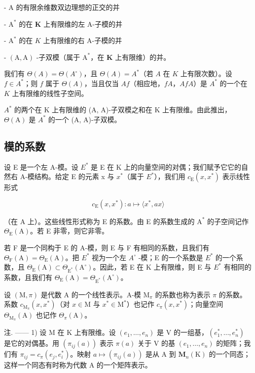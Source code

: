 - \(\mathrm{A}\) 的有限余维数双边理想的正交的并

- \(\mathrm{A}^*\) 的在 \(\mathbf{K}\) 上有限维的左 A-子模的并

- \(\mathrm{A}^*\) 的在 \(K\) 上有限维的右 A-子模的并

- \((\mathrm{A},\mathrm{A})\) -子双模（属于 \(\mathrm{A}^*\)，在 \(\mathbf{K}\) 上有限维）的并。

我们有 \(\Theta(A) = \Theta(A^{\circ})\)，且 \(\Theta(A) = A^{*}\)（若 \(A\) 在 \(K\) 上有限次数）。设 \(f \in A^{*}\)；则 \(f\) 属于 \(\Theta(A)\)，当且仅当 \(Af\)（相应地，\(fA\)，\(AfA\)）是 \(A^{*}\) 的一个在 \(K\) 上有限维的线性子空间。

\(A^{*}\) 的两个在 K 上有限维的 (A, A)-子双模之和在 K 上有限维。由此推出，\(\Theta(\mathrm{A})\) 是 \(A^{*}\) 的一个 (A, A)-子双模。

\subsection{模的系数}

设 E 是一个左 A-模。设 \(E^{*}\) 是 E 在 K 上的向量空间的对偶；我们赋予它它的自然右 A-模结构。给定 E 的元素 x 与 \(x^{*}\)（属于 \(E^{*}\)），我们用 \(c_{\mathrm{E}}(x, x^{*})\) 表示线性形式

\[
c _ {\mathrm{E}} (x, x ^ {*}): a \mapsto \langle x ^ {*}, a x \rangle\tag{5}
\]

（在 A 上）。这些线性形式称为 E 的系数。由 E 的系数生成的 \(\mathrm{A}^*\) 的子空间记作 \(\Theta_{\mathrm{E}}(\mathrm{A})\)。若 E 非零，则它非零。

若 F 是一个同构于 E 的 A-模，则 E 与 F 有相同的系数，且我们有 \(\Theta_{\mathrm{F}}(\mathrm{A}) = \Theta_{\mathrm{E}}(\mathrm{A})\)。把 \(E^{*}\) 视为一个左 \(A^{\circ}\) -模；E 的一个系数是 \(E^{*}\) 的一个系数，且 \(\Theta_{\mathrm{E}}(\mathrm{A}) \subset \Theta_{\mathrm{E}^{*}}(\mathrm{A}^{\circ})\)。因此，若 E 在 K 上有限维，则 E 与 \(E^{*}\) 有相同的系数，且我们有 \(\Theta_{\mathrm{E}}(\mathrm{A}) = \Theta_{\mathrm{E}^{*}}(\mathrm{A}^{\circ})\)。

设 \((\mathrm{M},\pi)\) 是代数 A 的一个线性表示。A-模 \(\mathrm{M}_{\pi}\) 的系数也称为表示 \(\pi\) 的系数。系数 \(c_{\mathrm{M}_{\pi}}(x,x^{*})\)（对 \(x\in \mathrm{M}\) 与 \(x^{*}\in \mathrm{M}^{*}\)）也记作 \(c_{\pi}(x,x^{*})\)；向量空间 \(\Theta_{\mathrm{M}_{\pi}}(\mathrm{A})\) 也记作 \(\Theta_{\pi}(\mathrm{A})\)。

注. —— 1) 设 M 在 K 上有限维。设 \((e_1, \ldots, e_n)\) 是 V 的一组基，\((e_1^*, \ldots, e_n^*)\) 是它的对偶基。用 \((\pi_{ij}(a))\) 表示 \(\pi(a)\) 关于 V 的基 \((e_1, \ldots, e_n)\) 的矩阵；我们有 \(\pi_{ij} = c_\pi(e_j, e_i^*)\)。映射 \(a \mapsto (\pi_{ij}(a))\) 是从 A 到 \(\mathbf{M}_n(\mathrm{K})\) 的一个同态；这样一个同态有时称为代数 A 的一个矩阵表示。

